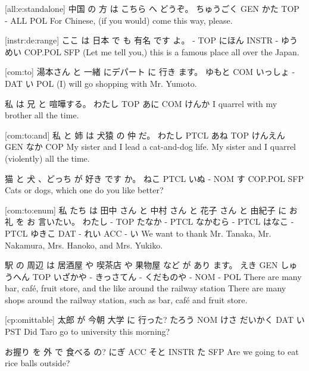 [all:e:standalone]
中国      の  方    は こちら へ どうぞ。
ちゅうごく GEN かた TOP -    ALL POL
For Chinese, (if you would) come this way, please.

[instr:de:range]
ここ は  日本    で   も  有名    です   よ。
-   TOP にほん INSTR - ゆうめい COP.POL SFP
(Let me tell you,) this is a famous place all over the Japan.

[com:to]
湯本さん と  一緒 にデパート に 行き ます。
ゆもと  COM いっしょ -    DAT い  POL
(I) will go shopping with Mr. Yumoto.

私     は  兄  と  喧嘩する。
わたし TOP あに COM けんか
I quarrel with my brother all the time.

[com:to:and]
私     と   姉   は   犬猿   の  仲   だ。
わたし PTCL あね TOP けんえん GEN なか COP
My sister and I lead a cat-and-dog life.
My sister and I quarrel (violently) all the time.

猫    と  犬 、どっち が 好き です    か。
ねこ PTCL いぬ -     NOM す COP.POL SFP
Cats or dogs, which one do you like better?

[com:to:enum]
私 たち  は  田中 さん と   中村 さん  と    花子 さん と  由紀子 に  お 礼   を お 言いたい。
わたし - TOP たなか - PTCL なかむら - PTCL はなこ - PTCL ゆきこ DAT - れい ACC - い
We want to thank Mr. Tanaka, Mr. Nakamura, Mrs. Hanoko, and Mrs. Yukiko.

駅   の  周辺       は 居酒屋  や 喫茶店    や 果物屋    など が あり ます。
えき GEN しゅうへん TOP いざかや - きっさてん - くだものや -  NOM -   POL
There are many bar, café, fruit store, and the like around the railway station
There are many shops around the railway station, such as bar, café and fruit store.

[cp:omittable]
太郎   が  今朝 大学    に   行った?
たろう NOM けさ だいかく DAT い PST
Did Taro go to university this morning?

お握り を   外  で      食べる の?
にぎ   ACC そと INSTR  た SFP
Are we going to eat rice balls outside?

